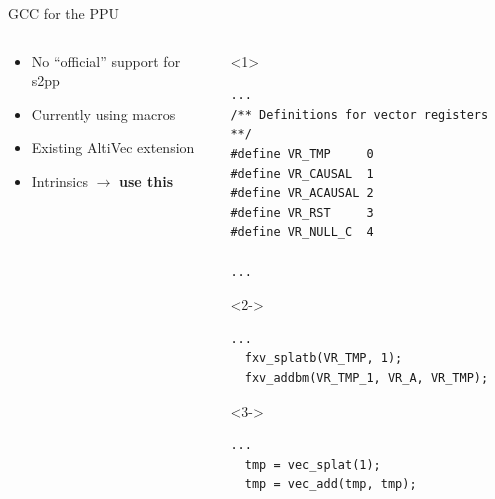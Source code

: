 \documentclass[10pt,aspectratio=169]{beamer}
\begin{document}
\begin{frame}[fragile]{GCC for the PPU}
    \begin{columns}[c]
    \begin{column}{0.5\textwidth}
        \begin{itemize}
			\setlength\itemsep{1em}
            \item No ``official'' support for s2pp
			\item Currently using macros
			\item<3-> Existing AltiVec extension
			\item<4-> Intrinsics $\rightarrow$ \textbf{use this}
        \end{itemize}
    \end{column}

    \begin{column}{0.5\textwidth}
        \centering
		\begin{onlyenv}<1>
				\begin{lstlisting}[title=Example from ppu\_sweep.c]
...
/** Definitions for vector registers **/
#define VR_TMP     0
#define VR_CAUSAL  1
#define VR_ACAUSAL 2
#define VR_RST     3
#define VR_NULL_C  4

...
				\end{lstlisting}
	\end{onlyenv}

		\begin{onlyenv}<2->
				\begin{lstlisting}[title=Example of Macro Usage]
				...
  fxv_splatb(VR_TMP, 1);
  fxv_addbm(VR_TMP_1, VR_A, VR_TMP);
				\end{lstlisting}
	\end{onlyenv}

		\begin{onlyenv}<3->
				\begin{lstlisting}[title=Example of AltiVec]
				...
  tmp = vec_splat(1);
  tmp = vec_add(tmp, tmp);
				\end{lstlisting}
	\end{onlyenv}
    \end{column}
    \end{columns}
\end{frame}
\end{document}
